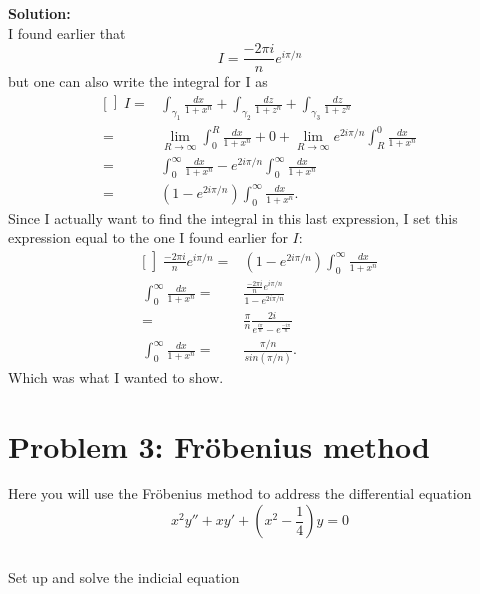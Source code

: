 \documentclass[a4paper,12pt]{article}
\begin{document}
\textbf{Solution:}\\
I found earlier that
$$I = \frac{-2\pi i}{n}e^{i\pi/n}$$
but one can also write the integral for I as
\begin{equation*}
 \begin{aligned}[\left]
  I =& \int_{\gamma_1}\frac{dx}{1+x^n} + \int_{\gamma_2} \frac{dz}{1+z^n} + \int_{\gamma_3}\frac{dz}{1+z^n}\\
   =& \lim_{R\rightarrow\infty} \int_0^R\frac{dx}{1+x^n} + 0 + \lim_{R\rightarrow\infty} e^{2i\pi/n}\int_R^0\frac{dx}{1+x^n}\\
   =& \int_0^\infty\frac{dx}{1+x^n} - e^{2i\pi/n}\int_0^\infty\frac{dx}{1+x^n}\\
   =& (1-e^{2i\pi/n})\int_0^\infty\frac{dx}{1+x^n}.
 \end{aligned}
\end{equation*}
Since I actually want to find the integral in this last expression, I set this expression equal to the one I found earlier for $I$:
\begin{equation*}
 \begin{aligned}[\left]
  \frac{-2\pi i}{n}e^{i\pi/n}   =& (1-e^{2i\pi/n})\int_0^\infty\frac{dx}{1+x^n}\\
  \int_0^\infty\frac{dx}{1+x^n} =& \frac{\frac{-2\pi i}{n}e^{i\pi/n}}{1-e^{2i\pi/n}}\\
=& \frac{\pi}{n} \frac{2i}{{e^{\frac{i\pi}{n}}-e^\frac{-i\pi}{n}}}\\
\int_0^\infty\frac{dx}{1+x^n}=& \frac{\pi/n}{sin(\pi/n)}.
\end{aligned}
\end{equation*}
Which was what I wanted to show.

\section{Problem 3: Fröbenius method}
Here you will use the Fröbenius method to address the differential equation
\begin{equation}
 x^2y'' +xy' + (x^2-\frac{1}{4})y = 0
\end{equation}

\subsection{}
Set up and solve the indicial equation
\end{document}
